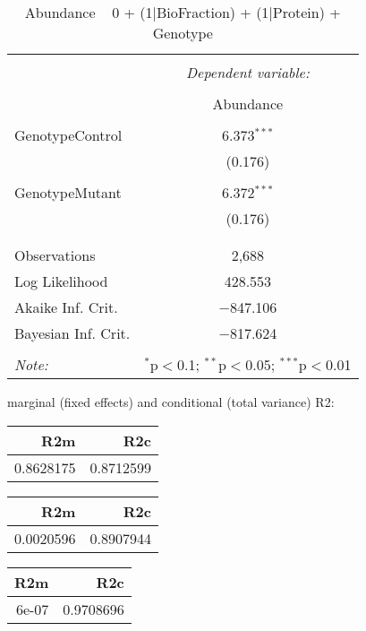 \documentclass[11pt]{report}
\begin{document}
\begin{table}[!htbp] \centering 
  \caption{Abundance ~ 0 + (1|BioFraction) + (1|Protein) + Genotype} 
  \label{} 
\begin{tabular}{@{\extracolsep{5pt}}lc} 
\\[-1.8ex]\hline 
\hline \\[-1.8ex] 
 & \multicolumn{1}{c}{\textit{Dependent variable:}} \\ 
\cline{2-2} 
\\[-1.8ex] & Abundance \\ 
\hline \\[-1.8ex] 
 GenotypeControl & 6.373$^{***}$ \\ 
  & (0.176) \\ 
  & \\ 
 GenotypeMutant & 6.372$^{***}$ \\ 
  & (0.176) \\ 
  & \\ 
\hline \\[-1.8ex] 
Observations & 2,688 \\ 
Log Likelihood & 428.553 \\ 
Akaike Inf. Crit. & $-$847.106 \\ 
Bayesian Inf. Crit. & $-$817.624 \\ 
\hline 
\hline \\[-1.8ex] 
\textit{Note:}  & \multicolumn{1}{r}{$^{*}$p$<$0.1; $^{**}$p$<$0.05; $^{***}$p$<$0.01} \\ 
\end{tabular} 
\end{table} 
marginal (fixed effects) and conditional (total variance) R2:

\begin{tabular}{r|r}
\hline
R2m & R2c\\
\hline
0.8628175 & 0.8712599\\
\hline
\end{tabular}

\begin{tabular}{r|r}
\hline
R2m & R2c\\
\hline
0.0020596 & 0.8907944\\
\hline
\end{tabular}

\begin{tabular}{r|r}
\hline
R2m & R2c\\
\hline
6e-07 & 0.9708696\\
\hline
\end{tabular}
\end{document}
